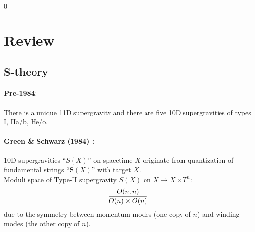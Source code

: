 \documentclass[12pt]{article} %
\numberwithin{equation}{section}
\begin{document}
\thispagestyle{empty}

\newpage

\tableofcontents
\setcounter{page}0
\thispagestyle{empty}

\newpage




\section{Review}

\subsection{S-theory}

\paragraph{
	Pre-1984:
}
There is a unique 11D supergravity and there are five 10D supergravities 
of types I, II{\sc a/b}, H{\sc e/o}.



\paragraph{
	Green \&{} Schwarz (1984) \cite{Green:1984sg}:
}
10D supergravities ``$S(X)$'' on spacetime $X$ 
originate from quantization of fundamental strings ``$\mathbf S(X)$'' with target $X$. \\

\noindent
Moduli space of Type-II supergravity $S(X)$ on $X \to X\times T^n$:
\begin{align*}
{O(n,n) \over O(n)\times O(n)} 
\end{align*}
due to the symmetry between momentum modes (one copy of $n$) and winding modes 
(the other copy of $n$).
\end{document}

